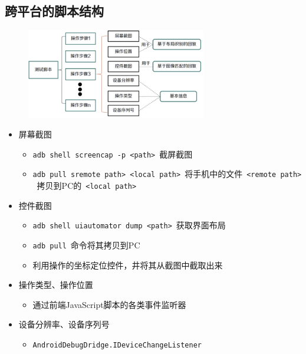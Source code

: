 \subsection{跨平台的脚本结构}
\begin{figure}[H]
    \vspace{-0.5em}
	\centering
	\includegraphics[width=0.7\textwidth]{images/跨平台的脚本结构.png}
    \vspace{-1em}
\end{figure}

\begin{itemize}
    \item 屏幕截图
    \begin{itemize}
        \item \verb|adb shell screencap -p <path>|\ 截屏截图
        \item \verb|adb pull sremote path> <local path>|\ 将手机中的文件\ \verb|<remote path>| \ 拷贝到PC的\ \verb|<local path>|
    \end{itemize}
    \item 控件截图
    \begin{itemize}
        \item \verb|adb shell uiautomator dump <path>|\ 获取界面布局
        \item \verb|adb pull|\ 命令将其拷贝到PC
        \item 利用操作的坐标定位控件，井将其从截图中截取出来
    \end{itemize}
    \item 操作类型、操作位置
    \begin{itemize}
        \item 通过前端JavaScript脚本的各类事件监听器
    \end{itemize}
    \item 设备分辨率、设备序列号
    \begin{itemize}
        \item \verb|AndroidDebugDridge.IDeviceChangeListener|
    \end{itemize}
\end{itemize}

